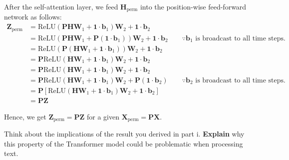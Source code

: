 \begin{parts}
\begin{subparts}
{            After the self-attention layer, we feed $\mathbf{H}_{\text{perm}}$ into the position-wise feed-forward network as follows:
            \begin{align*}
                \mathbf{Z}_{\text{perm}}
                &= \text{ReLU}(\mathbf{PH}\mathbf{W}_1 + \mathbf{1}\cdot\mathbf{b}_1)\mathbf{W}_2 + \mathbf{1}\cdot\mathbf{b}_2 \\
                &= \text{ReLU}(\mathbf{PH}\mathbf{W}_1 + \mathbf{P}(\mathbf{1}\cdot\mathbf{b}_1))\mathbf{W}_2 + \mathbf{1}\cdot\mathbf{b}_2 \quad\quad \because \mathbf{b}_1 \text{ is broadcast to all time steps.} \\
                &= \text{ReLU}(\mathbf{P}(\mathbf{H}\mathbf{W}_1 + \mathbf{1}\cdot\mathbf{b}_1))\mathbf{W}_2 + \mathbf{1}\cdot\mathbf{b}_2 \\
                &= \mathbf{P} \text{ReLU}(\mathbf{H}\mathbf{W}_1 + \mathbf{1}\cdot\mathbf{b}_1)\mathbf{W}_2 + \mathbf{1}\cdot\mathbf{b}_2 \\
                &= \mathbf{P} \text{ReLU}(\mathbf{H}\mathbf{W}_1 + \mathbf{1}\cdot\mathbf{b}_1)\mathbf{W}_2 + \mathbf{1}\cdot\mathbf{b}_2 \\
                &= \mathbf{P} \text{ReLU}(\mathbf{H}\mathbf{W}_1 + \mathbf{1}\cdot\mathbf{b}_1)\mathbf{W}_2 + \mathbf{P}(\mathbf{1}\cdot\mathbf{b}_2) \quad\quad \because \mathbf{b}_2 \text{ is broadcast to all time steps.} \\
                &= \mathbf{P}[\text{ReLU}(\mathbf{H}\mathbf{W}_1 + \mathbf{1}\cdot\mathbf{b}_1)\mathbf{W}_2 + \mathbf{1}\cdot\mathbf{b}_2] \\
                &= \mathbf{PZ}
            \end{align*}

            Hence, we get $\mathbf{Z}_{\text{perm}} = \mathbf{PZ}$ for a given $\mathbf{X}_{\text{perm}} = \mathbf{PX}$.
        }

        \subpart[1] Think about the implications of the result you derived in part i. \textbf{Explain} why this property of the Transformer model could be problematic when processing text.

    \end{subparts}


\end{parts}
